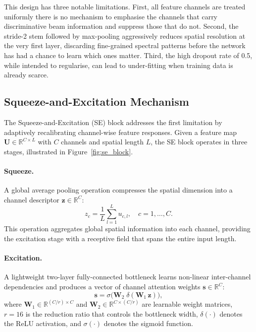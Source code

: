 \documentclass[12pt,a4paper]{article}
\begin{document}
This design has three notable limitations.  First, all feature channels are treated uniformly  there is no mechanism to emphasise the channels that carry discriminative beam information and suppress those that do not.  Second, the stride-2 stem followed by max-pooling aggressively reduces spatial resolution at the very first layer, discarding fine-grained spectral patterns before the network has had a chance to learn which ones matter.  Third, the high dropout rate of 0.5, while intended to regularise, can lead to under-fitting when training data is already scarce.

\subsection{Squeeze-and-Excitation Mechanism}\label{subsec:se}

The Squeeze-and-Excitation (SE) block addresses the first limitation by adaptively recalibrating channel-wise feature responses.  Given a feature map $\mathbf{U}\in\mathbb{R}^{C\times L}$ with $C$ channels and spatial length $L$, the SE block operates in three stages, illustrated in Figure~\ref{fig:se_block}.

\paragraph{Squeeze.}
A global average pooling operation compresses the spatial dimension into a channel descriptor $\mathbf{z}\in\mathbb{R}^{C}$:
\begin{equation}
  z_c = \frac{1}{L}\sum_{l=1}^{L} u_{c,l}, \quad c=1,\dots,C.
  \label{eq:squeeze}
\end{equation}
This operation aggregates global spatial information into each channel, providing the excitation stage with a receptive field that spans the entire input length.

\paragraph{Excitation.}
A lightweight two-layer fully-connected bottleneck learns non-linear inter-channel dependencies and produces a vector of channel attention weights $\mathbf{s}\in\mathbb{R}^{C}$:
\begin{equation}
  \mathbf{s} = \sigma\!\bigl(\mathbf{W}_2\;\delta(\mathbf{W}_1\,\mathbf{z})\bigr),
  \label{eq:excite}
\end{equation}
where $\mathbf{W}_1\in\mathbb{R}^{(C/r)\times C}$ and $\mathbf{W}_2\in\mathbb{R}^{C\times(C/r)}$ are learnable weight matrices, $r=16$ is the reduction ratio that controls the bottleneck width, $\delta(\cdot)$ denotes the ReLU activation, and $\sigma(\cdot)$ denotes the sigmoid function.
\end{document}
